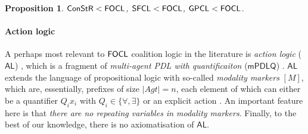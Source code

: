 \documentclass{article}
\newtheorem{proposition}{Proposition}
\begin{document}


\begin{proposition}
    $\mathsf{ConStR} < \mathsf{FOCL}$, $\mathsf{SFCL} < \mathsf{FOCL}$, $\mathsf{GPCL} < \mathsf{FOCL}$.
\end{proposition}

\paragraph{Action logic} 

A perhaps most relevant to $\mathsf{FOCL}$ coalition logic in the literature is \textit{action logic} ($\mathsf{AL}$) \cite{borgo07}, which is a fragment of \textit{multi-agent PDL with quantificaiton} ($\mathsf{mPDLQ}$) \cite{borgo05}. $\mathsf{AL}$ extends the language of propositional logic with so-called \textit{modality markers} $[M]$, which are, essentially, prefixes of size $|Agt| = n$, each element of which can either be a quantifier $Q_i x_i$ with $Q_i \in \{\forall, \exists\}$ or an explicit action \cite{borgo05,borgo05b}. An important feature here is that \textit{there are no repeating variables in modality markers}. Finally, to the best of our knowledge, there is no axiomatisation of  $\mathsf{AL}$.
\end{document}
